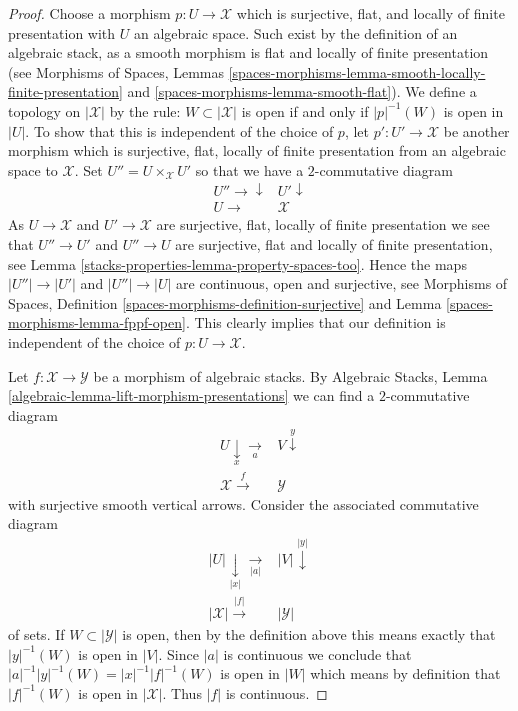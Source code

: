 \begin{proof}
Choose a morphism $p : U \to \mathcal{X}$ which is
surjective, flat, and locally of finite presentation
with $U$ an algebraic space. Such exist by the definition of an algebraic
stack, as a smooth morphism is flat and locally of finite presentation
(see
Morphisms of Spaces,
Lemmas \ref{spaces-morphisms-lemma-smooth-locally-finite-presentation} and
\ref{spaces-morphisms-lemma-smooth-flat}).
We define a topology on $|\mathcal{X}|$ by the rule:
$W \subset |\mathcal{X}|$ is open if and only if $|p|^{-1}(W)$ is open
in $|U|$. To show that this is independent of the choice of $p$, let
$p' : U' \to \mathcal{X}$ be another morphism which is surjective, flat,
locally of finite presentation from an algebraic space to
$\mathcal{X}$. Set $U'' = U \times_\mathcal{X} U'$
so that we have a $2$-commutative diagram
$$
\begin{array}{cc}U'' \longrightarrow\downarrow & U' \downarrow \\ U \longrightarrow & \mathcal{X}\end{array}
$$
As $U \to \mathcal{X}$ and $U' \to \mathcal{X}$ are surjective, flat,
locally of finite presentation we see that $U'' \to U'$ and $U'' \to U$
are surjective, flat and locally of finite presentation, see
Lemma \ref{stacks-properties-lemma-property-spaces-too}.
Hence the maps $|U''| \to |U'|$ and $|U''| \to |U|$ are continuous, open
and surjective, see
Morphisms of Spaces,
Definition \ref{spaces-morphisms-definition-surjective} and
Lemma \ref{spaces-morphisms-lemma-fppf-open}.
This clearly implies that our definition is independent of the choice
of $p : U \to \mathcal{X}$.

\medskip\noindent
Let $f : \mathcal{X} \to \mathcal{Y}$ be a morphism of algebraic stacks.
By
Algebraic Stacks, Lemma \ref{algebraic-lemma-lift-morphism-presentations}
we can find a $2$-commutative diagram
$$
\begin{array}{cc}U \underset{x}{\downarrow}\underset{a}{\longrightarrow} & V \overset{y}{\downarrow} \\ \mathcal{X} \overset{f}{\longrightarrow} & \mathcal{Y}\end{array}
$$
with surjective smooth vertical arrows.
Consider the associated commutative diagram
$$
\begin{array}{cc}|U| \underset{|x|}{\downarrow}\underset{|a|}{\longrightarrow} & |V| \overset{|y|}{\downarrow} \\ |\mathcal{X}| \overset{|f|}{\longrightarrow} & |\mathcal{Y}|\end{array}
$$
of sets. If $W \subset |\mathcal{Y}|$ is open, then by the definition
above this means exactly that $|y|^{-1}(W)$ is open in $|V|$. Since
$|a|$ is continuous we conclude that
$|a|^{-1}|y|^{-1}(W) = |x|^{-1}|f|^{-1}(W)$ is open in $|W|$ which means
by definition that $|f|^{-1}(W)$ is open in $|\mathcal{X}|$.
Thus $|f|$ is continuous.


\end{proof}
